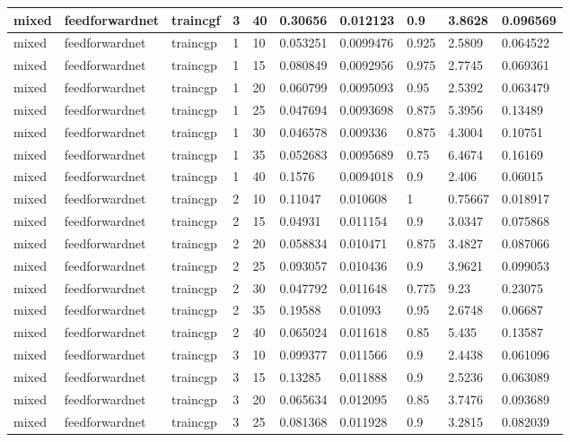\begin{longtable}{lllllllll}
mixed & feedforwardnet & traincgf & 3 & 40 & 0.30656 & 0.012123 & 0.9 & 3.8628 & 0.096569 \\ \hline 
mixed & feedforwardnet & traincgp & 1 & 10 & 0.053251 & 0.0099476 & 0.925 & 2.5809 & 0.064522 \\ \hline 
mixed & feedforwardnet & traincgp & 1 & 15 & 0.080849 & 0.0092956 & 0.975 & 2.7745 & 0.069361 \\ \hline 
mixed & feedforwardnet & traincgp & 1 & 20 & 0.060799 & 0.0095093 & 0.95 & 2.5392 & 0.063479 \\ \hline 
mixed & feedforwardnet & traincgp & 1 & 25 & 0.047694 & 0.0093698 & 0.875 & 5.3956 & 0.13489 \\ \hline 
mixed & feedforwardnet & traincgp & 1 & 30 & 0.046578 & 0.009336 & 0.875 & 4.3004 & 0.10751 \\ \hline 
mixed & feedforwardnet & traincgp & 1 & 35 & 0.052683 & 0.0095689 & 0.75 & 6.4674 & 0.16169 \\ \hline 
mixed & feedforwardnet & traincgp & 1 & 40 & 0.1576 & 0.0094018 & 0.9 & 2.406 & 0.06015 \\ \hline 
mixed & feedforwardnet & traincgp & 2 & 10 & 0.11047 & 0.010608 & 1 & 0.75667 & 0.018917 \\ \hline 
mixed & feedforwardnet & traincgp & 2 & 15 & 0.04931 & 0.011154 & 0.9 & 3.0347 & 0.075868 \\ \hline 
mixed & feedforwardnet & traincgp & 2 & 20 & 0.058834 & 0.010471 & 0.875 & 3.4827 & 0.087066 \\ \hline 
mixed & feedforwardnet & traincgp & 2 & 25 & 0.093057 & 0.010436 & 0.9 & 3.9621 & 0.099053 \\ \hline 
mixed & feedforwardnet & traincgp & 2 & 30 & 0.047792 & 0.011648 & 0.775 & 9.23 & 0.23075 \\ \hline 
mixed & feedforwardnet & traincgp & 2 & 35 & 0.19588 & 0.01093 & 0.95 & 2.6748 & 0.06687 \\ \hline 
mixed & feedforwardnet & traincgp & 2 & 40 & 0.065024 & 0.011618 & 0.85 & 5.435 & 0.13587 \\ \hline 
mixed & feedforwardnet & traincgp & 3 & 10 & 0.099377 & 0.011566 & 0.9 & 2.4438 & 0.061096 \\ \hline 
mixed & feedforwardnet & traincgp & 3 & 15 & 0.13285 & 0.011888 & 0.9 & 2.5236 & 0.063089 \\ \hline 
mixed & feedforwardnet & traincgp & 3 & 20 & 0.065634 & 0.012095 & 0.85 & 3.7476 & 0.093689 \\ \hline 
mixed & feedforwardnet & traincgp & 3 & 25 & 0.081368 & 0.011928 & 0.9 & 3.2815 & 0.082039 \\ \hline 

\end{longtable}
